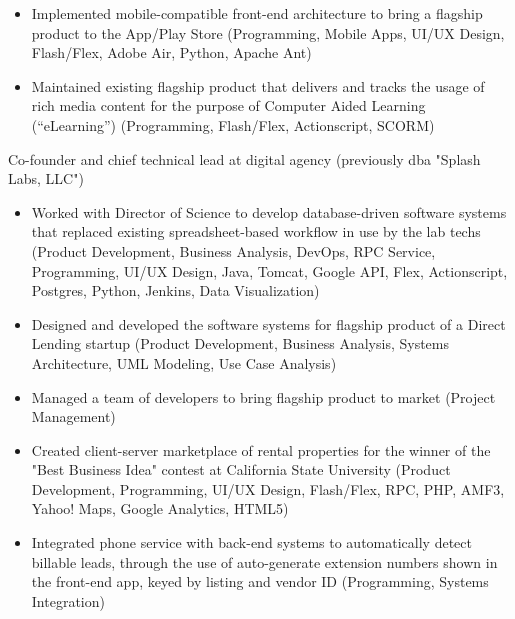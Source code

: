 \begin{itemize}
  \item Implemented mobile-compatible front-end architecture to bring a flagship product to the App/Play Store {\tiny (Programming, Mobile Apps, UI/UX Design, Flash/Flex, Adobe Air, Python, Apache Ant)}
  \item Maintained existing flagship product that delivers and tracks the usage of rich media content for the purpose of Computer Aided Learning (“eLearning”) {\tiny (Programming, Flash/Flex, Actionscript, SCORM)}
\end{itemize}

\divider



Co-founder and chief technical lead at digital agency (previously dba "Splash Labs, LLC")

\begin{itemize}
  \item Worked with Director of Science to develop database-driven software systems that replaced existing spreadsheet-based workflow in use by the lab techs {\tiny (Product Development, Business Analysis, DevOps, RPC Service, Programming, UI/UX Design, Java, Tomcat, Google API, Flex, Actionscript, Postgres, Python, Jenkins, Data Visualization)}
\end{itemize}

\begin{itemize}
  \item Designed and developed the software systems for flagship product of a Direct Lending startup {\tiny (Product Development, Business Analysis, Systems Architecture, UML Modeling, Use Case Analysis)}
  \item Managed a team of developers to bring flagship product to market {\tiny (Project Management)}
\end{itemize}

\begin{itemize}
  \item Created client-server marketplace of rental properties for the winner of the "Best Business Idea" contest at California State University {\tiny (Product Development, Programming, UI/UX Design, Flash/Flex, RPC, PHP, AMF3, Yahoo! Maps, Google Analytics, HTML5)}
  \item Integrated phone service with back-end systems to automatically detect billable leads, through the use of auto-generate extension numbers shown in the front-end app, keyed by listing and vendor ID {\tiny (Programming, Systems Integration)}
\end{itemize}

